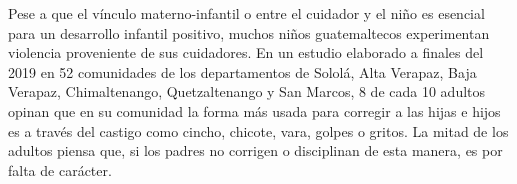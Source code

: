 Pese a que el vínculo materno-infantil o entre el cuidador y el niño es
esencial para un desarrollo infantil positivo, muchos niños guatemaltecos
experimentan violencia proveniente de sus cuidadores. En un estudio elaborado a
finales del 2019 en 52 comunidades de los departamentos de Sololá,
Alta Verapaz, Baja Verapaz, Chimaltenango, Quetzaltenango y San Marcos, 8 de
cada 10 adultos opinan que en su comunidad la forma más usada para corregir a
las hijas e hijos es a través del castigo como cincho, chicote, vara, golpes o
gritos. La mitad de los adultos piensa que, si los padres no corrigen o
disciplinan de esta manera, es por falta de carácter.
\cite{PoliticaInfanciaGuate} \cite{UNICEFComportamientosNinez}
